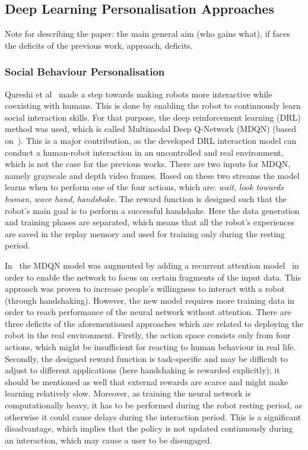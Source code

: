 \documentclass[thesis]{mas_proposal}
\begin{document}
\subsection{Deep Learning Personalisation Approaches}

{\color{red}Note for describing the paper: the main general aim (who gains what), if faces the deficits of the previous work, approach, deficits.}

\subsubsection{Social Behaviour Personalisation}
Qureshi et al~\cite{Qureshi2016} made a step towards making robots more interactive while coexisting with humans. This is done by enabling the robot to continuously learn social interaction skills. For that purpose, the deep reinforcement learning (DRL) method was used, which is called Multimodal Deep Q-Network (MDQN) (based on~\cite{mnih2015human}). This is a major contribution, as the developed DRL interaction model can conduct a human-robot interaction in an uncontrolled and real environment, which is not the case for the previous works. There are two inputs for MDQN, namely grayscale and depth video frames. Based on these two streams the model learns when to perform one of the four actions, which are: \emph{wait}, \emph{look towards human}, \emph{wave hand}, \emph{handshake}. The reward function is designed such that the robot's main goal is to perform a successful handshake. Here the data generation and training phases are separated, which means that all the robot's experiences are saved in the replay memory and used for training only during the resting period. 

In~\cite{Qureshi2017} the MDQN model was augmented by adding a recurrent attention model~\cite{sorokin2015deep} in order to enable the network to focus on certain fragments of the input data. This approach was proven to increase people's willingness to interact with a robot (through handshaking). However, the new model requires more training data in order to reach performance of the neural network without attention. There are three deficits of the aforementioned approaches which are related to deploying the robot in the real environment. Firstly, the action space consists only from four actions, which might be insufficient for reacting to human behaviour in real life. Secondly, the designed reward function is task-specific and may be difficult to adjust to different applications (here handshaking is rewarded explicitly); it should be mentioned as well that external rewards are scarce and might make learning relatively slow. Moreover, as training the neural network is computationally heavy, it has to be performed during the robot resting period, as otherwise it could cause delays during the interaction period. This is a significant disadvantage, which implies that the policy is not updated continuously during an interaction, which may cause a user to be disengaged. 
\end{document}
